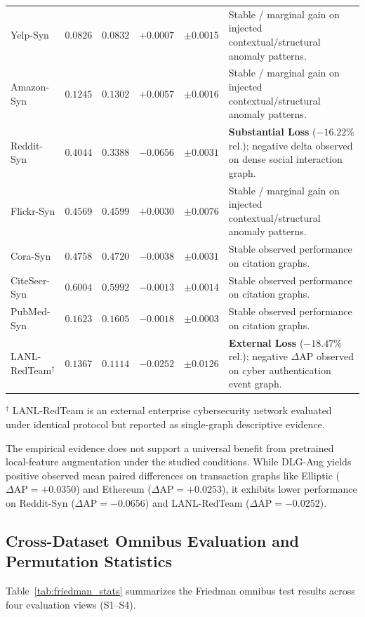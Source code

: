 \documentclass[11pt,a4paper]{article}
\begin{document}
\begin{table}[htbp]
\begin{tabularx}{\textwidth}{lrrrr>{\raggedright\arraybackslash}X}
Yelp-Syn & $0.0826$ & $0.0832$ & $+0.0007$ & $\pm 0.0015$ & Stable / marginal gain on injected contextual/structural anomaly patterns. \\
Amazon-Syn & $0.1245$ & $0.1302$ & $+0.0057$ & $\pm 0.0016$ & Stable / marginal gain on injected contextual/structural anomaly patterns. \\
Reddit-Syn & $0.4044$ & $0.3388$ & $\mathbf{-0.0656}$ & $\pm 0.0031$ & \textbf{Substantial Loss} ($-16.22\%$ rel.); negative delta observed on dense social interaction graph. \\
Flickr-Syn & $0.4569$ & $0.4599$ & $+0.0030$ & $\pm 0.0076$ & Stable / marginal gain on injected contextual/structural anomaly patterns. \\
Cora-Syn & $0.4758$ & $0.4720$ & $-0.0038$ & $\pm 0.0031$ & Stable observed performance on citation graphs. \\
CiteSeer-Syn & $0.6004$ & $0.5992$ & $-0.0013$ & $\pm 0.0014$ & Stable observed performance on citation graphs. \\
PubMed-Syn & $0.1623$ & $0.1605$ & $-0.0018$ & $\pm 0.0003$ & Stable observed performance on citation graphs. \\
LANL-RedTeam$^{\dagger}$ & $0.1367$ & $0.1114$ & $-0.0252$ & $\pm 0.0126$ & \textbf{External Loss} ($-18.47\%$ rel.); negative $\Delta\mathrm{AP}$ observed on cyber authentication event graph. \\
\bottomrule
\end{tabularx}
\begin{tablenotes}\footnotesize
\item $^{\dagger}$ LANL-RedTeam is an external enterprise cybersecurity network evaluated under identical protocol but reported as single-graph descriptive evidence.
\end{tablenotes}
\end{table}


The empirical evidence does not support a universal benefit from pretrained local-feature augmentation under the studied conditions. While DLG-Aug yields positive observed mean paired differences on transaction graphs like Elliptic ($\Delta\mathrm{AP} = +0.0350$) and Ethereum ($\Delta\mathrm{AP} = +0.0253$), it exhibits lower performance on Reddit-Syn ($\Delta\mathrm{AP} = -0.0656$) and LANL-RedTeam ($\Delta\mathrm{AP} = -0.0252$).

\subsection{Cross-Dataset Omnibus Evaluation and Permutation Statistics}
Table~\ref{tab:friedman_stats} summarizes the Friedman omnibus test results across four evaluation views (S1--S4).
\end{document}
